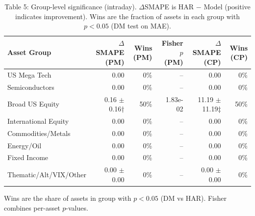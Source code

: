 \begin{table}[t]
\centering
\caption{Table 5: Group-level significance (intraday). $\Delta$SMAPE is HAR $-$ Model (positive indicates improvement). Wins are the fraction of assets in each group with $p<0.05$ (DM test on MAE).}
\label{tab:groups}
\begin{tabular}{l r r r r r}
\toprule
Asset Group & $\Delta$SMAPE (PM) & Wins (PM) & Fisher $p$ (PM) & $\Delta$SMAPE (CP) & Wins (CP) \\
\midrule
US Mega Tech & 0.00 & 0\% & -- & 0.00 & 0\% \\
Semiconductors & 0.00 & 0\% & -- & 0.00 & 0\% \\
Broad US Equity & 0.16 $\pm$ 0.16† & 50\% & 1.83e-02 & 11.19 $\pm$ 11.19‡ & 50\% \\
International Equity & 0.00 & 0\% & -- & 0.00 & 0\% \\
Commodities/Metals & 0.00 & 0\% & -- & 0.00 & 0\% \\
Energy/Oil & 0.00 & 0\% & -- & 0.00 & 0\% \\
Fixed Income & 0.00 & 0\% & -- & 0.00 & 0\% \\
Thematic/Alt/VIX/Other & 0.00 $\pm$ 0.00 & 0\% & -- & 0.00 $\pm$ 0.00 & 0\% \\
\bottomrule
\end{tabular}
\vspace{2pt}
\footnotesize{Wins are the share of assets in group with $p<0.05$ (DM vs HAR). Fisher combines per-asset $p$-values.}
\end{table}